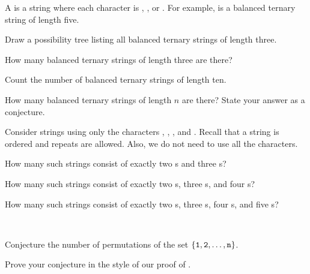 \begin{exer}[\exerE] %
\label{exer_bal_ternary_strings}
    A  is a string where each character is , \str{+}, or \str{-}.  For example,  is a balanced ternary string of length five.
    \begin{exerpart}
        \item Draw a possibility tree listing all balanced ternary strings of length three.
        \item How many balanced ternary strings of length three are there?
        \item Count the number of balanced ternary strings of length ten.
        \item How many balanced ternary strings of length $n$ are there?  State your answer as a conjecture.
    \end{exerpart}   
\end{exer}

\begin{exer} [\exerE] %
\label{exer_ABCD_strings}
    Consider strings using only the characters , , , and .  Recall that a string is ordered and repeats are allowed.  Also, we do not need to use all the characters.
    \begin{exerpart}
    \item How many such strings consist of exactly two s and three s?
    \item How many such strings consist of exactly two s, three s, and four s?
    \item How many such strings consist of exactly two s, three s, four s, and five s?
    \end{exerpart}
\end{exer}

\begin{exer} [\exerE] %
\label{exer_number_perms} 
~
    \begin{exerpart}
        \item Conjecture the number of permutations of the set $\{\texttt{1},\texttt{2},\ldots, \texttt{n}\}$.
        \item Prove your conjecture in the style of our proof of .
    \end{exerpart}
\end{exer}


